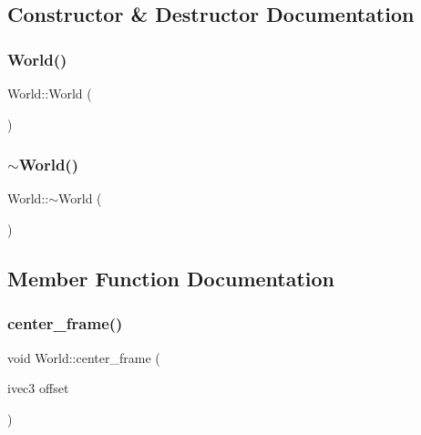 \subsection{Constructor \& Destructor Documentation}
\mbox{\label{classWorld_afa39d4e6f714a7a3691ac0c656f5e8a8}} 
\subsubsection{\texorpdfstring{World()}{World()}}
{\footnotesize\ttfamily World\+::\+World (\begin{DoxyParamCaption}{ }\end{DoxyParamCaption})}

\mbox{\label{classWorld_a8c73fba541a5817fff65147ba47cd827}} 
\subsubsection{\texorpdfstring{$\sim$\+World()}{~World()}}
{\footnotesize\ttfamily World\+::$\sim$\+World (\begin{DoxyParamCaption}{ }\end{DoxyParamCaption})}



\subsection{Member Function Documentation}
\mbox{\label{classWorld_a867700693b18b37cc9b5a1b8ba818286}} 
\subsubsection{\texorpdfstring{center\+\_\+frame()}{center\_frame()}}
{\footnotesize\ttfamily void World\+::center\+\_\+frame (\begin{DoxyParamCaption}\item[{ivec3}]{offset }\end{DoxyParamCaption})}

\mbox{\label{classWorld_ade33d093b4560af74cec4fa9264cf078}} 
